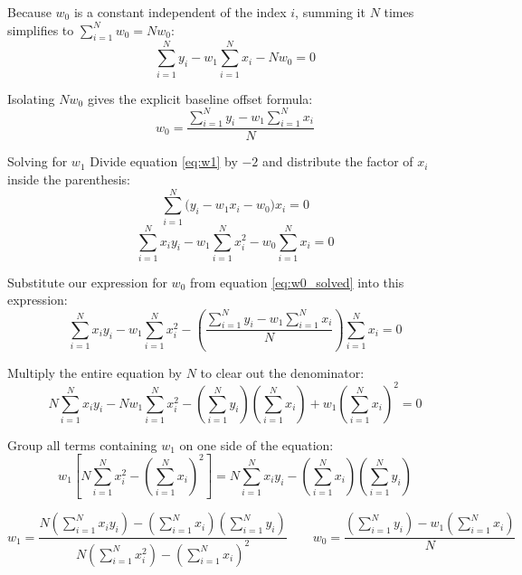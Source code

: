 Because $w_0$ is a constant independent of the index $i$, summing it $N$ times simplifies to $\sum_{i=1}^{N} w_0 = N w_0$:
\[
\sum_{i=1}^{N} y_i - w_1\sum_{i=1}^{N} x_i - N w_0 = 0
\]

Isolating $N w_0$ gives the explicit baseline offset formula:
\begin{equation}
w_0 = \frac{\sum_{i=1}^{N}y_i - w_1 \sum_{i=1}^{N}x_i}{N} \label{eq:w0_solved}
\end{equation}

Solving for $w_1$
Divide equation \eqref{eq:w1} by $-2$ and distribute the factor of $x_i$ inside the parenthesis:
\[
\sum_{i=1}^{N} \big(y_i - w_1x_i - w_0\big)x_i = 0
\]
\[
\sum_{i=1}^{N} x_i y_i - w_1\sum_{i=1}^{N} x_i^2 - w_0\sum_{i=1}^{N} x_i = 0
\]

Substitute our expression for $w_0$ from equation \eqref{eq:w0_solved} into this expression:
\[
\sum_{i=1}^{N} x_i y_i - w_1\sum_{i=1}^{N} x_i^2 - \left(\frac{\sum_{i=1}^{N}y_i - w_1 \sum_{i=1}^{N}x_i}{N}\right)\sum_{i=1}^{N} x_i = 0
\]

Multiply the entire equation by $N$ to clear out the denominator:
\[
N\sum_{i=1}^{N} x_i y_i - N w_1\sum_{i=1}^{N} x_i^2 - \left(\sum_{i=1}^{N}y_i\right)\left(\sum_{i=1}^{N} x_i\right) + w_1\left(\sum_{i=1}^{N}x_i\right)^2 = 0
\]

Group all terms containing $w_1$ on one side of the equation:
\[
w_1 \left[ N\sum_{i=1}^{N} x_i^2 - \left(\sum_{i=1}^{N}x_i\right)^2 \right] = N\sum_{i=1}^{N} x_i y_i - \left(\sum_{i=1}^{N}x_i\right)\left(\sum_{i=1}^{N}y_i\right)
\]



\[
w_1 = \frac{N(\sum_{i=1}^{N} x_i y_i) - (\sum_{i=1}^{N}x_i) (\sum_{i=1}^{N}y_i)}
{N(\sum_{i=1}^{N}x_i^2) - (\sum_{i=1}^{N}x_i)^2}
\qquad
w_0 = \frac{(\sum_{i=1}^{N}y_i) - w_1 (\sum_{i=1}^{N}x_i)}{N}
\]




